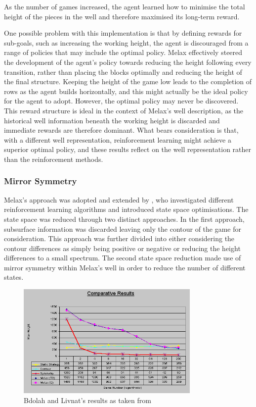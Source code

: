 \documentclass{rucsthesis}
\begin{document}
As the number of games increased, the agent learned how to minimise the total height of the pieces in the well and therefore maximised its long-term reward.

One possible problem with this implementation is that by defining rewards for sub-goals, such as increasing the working height, the agent is discouraged from a range of policies that may include the optimal policy.  Melax effectively steered the development of the agent's policy towards reducing the height following every transition, rather than placing the blocks optimally and reducing the height of the final structure. Keeping the height of the game low leads to the completion of rows as the agent builds horizontally, and this might actually be the ideal policy for the agent to adopt. However, the optimal policy may never be discovered. This reward structure is ideal in the context of Melax's well description, as the historical well information beneath the working height is discarded and immediate rewards are therefore dominant. What bears consideration is that, with a different well representation, reinforcement learning might achieve a superior optimal policy, and these results reflect on the well representation rather than the reinforcement methods.

\subsubsection{Mirror Symmetry}

Melax's approach was adopted and extended by \cite{yaeltetris}, who investigated different reinforcement learning algorithms and introduced state space optimisations. The state space was reduced through two distinct approaches. In the first approach, subsurface information was discarded leaving only the contour of the game for consideration. This approach was further divided into either considering the contour differences as simply being positive or negative or reducing the height differences to a small spectrum. The second state space reduction made use of mirror symmetry within Melax's well in order to reduce the number of different states.

\begin{figure}[h]
\centering
\includegraphics[width=3.5in]{results.png}
\caption{Bdolah and Livnat's results as taken from \cite{yaeltetris}}
\label{fig:yaelres}
\end{figure}
\end{document}
